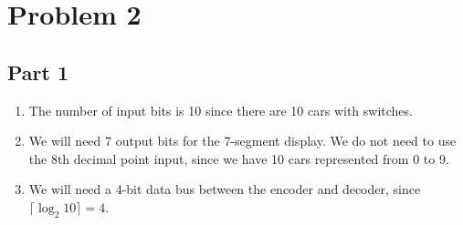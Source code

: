 \documentclass{article}
\begin{document}
\section{Problem 2}

\subsection{Part 1}
\begin{enumerate}
    \item The number of input bits is 10 since there are 10 cars with switches.
    \item We will need 7 output bits for the 7-segment display. We do not need to use the 8th decimal point input, since we have 10 cars represented from 0 to 9.
    \item We will need a 4-bit data bus between the encoder and decoder, since $\lceil \log_2 10 \rceil = 4$.
\end{enumerate}
\end{document}
